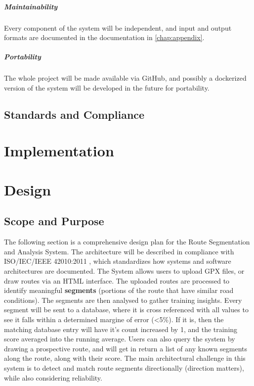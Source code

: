 \documentclass[11pt,twoside]{report}
\begin{document}
\paragraph{Maintainability}
Every component of the system will be independent, and input and output formats are documented in the documentation in \ref{chap:appendix}.

\paragraph{Portability}
The whole project will be made available via GitHub, and possibly a dockerized version of the system will be developed in the future for portability.

\section{Standards and Compliance}
\label{sec:standards}

\chapter{Implementation}
\label{chap:implement}

\chapter{Design}
\label{chap:design}

\section{Scope and Purpose}
The following section is a comprehensive design plan for the Route Segmentation and Analysis System.
The architecture will be described in compliance with ISO/IEC/IEEE 42010:2011 \citep{ISO42010}, which standardizes how systems
and software architectures are documented.
The System allows users to upload GPX files, or draw routes via an HTML interface. The uploaded routes are processed to
identify meaningful \textbf{segments} (portions of the route that have similar road conditions). The segments are then analysed to
gather training insights. Every segment will be sent to a database, where it is cross referenced with all values to see it falls within a determined
margine of error (<5\%). If it is, then the matching database entry will have it's count increased by 1, and the training score averaged into the running average.
Users can also query the system by drawing a prospective route, and will get in return a list of any known segments along the route, along with their
score. The main architectural challenge in this system is to detect and match route segments directionally (direction matters), while also considering
reliability.
\end{document}
